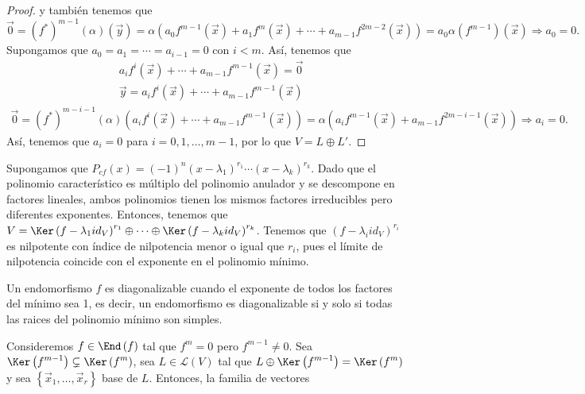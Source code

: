 \begin{proof}
y también tenemos que
\[ \vec{0} = \left(f^{*}\right)^{m -1}\left(\alpha \right)\left(\vec{y}\right) = \alpha \left(a_{0}f^{m -1}\left(\vec{x}\right) + a_{1}f^{m}\left(\vec{x}\right) + \cdots + a_{m -1}f^{2m-2}\left(\vec{x}\right)\right) = a_{0}\alpha\left(f^{m -1}\right)\left(\vec{x}\right) \Rightarrow a_{0} = 0.\]
Supongamos que $\displaystyle a_{0}= a_{1} = \cdots = a_{i-1} = 0 $ con $\displaystyle i < m $. Así, tenemos que
\[
\begin{split}
 & a_{i}f^{i}\left(\vec{x}\right) + \cdots + a_{m -1}f^{m -1}\left(\vec{x}\right) = \vec{0} \\
& \vec{y} = a_{i}f^{i}\left(\vec{x}\right) + \cdots + a_{m -1}f^{m -1}\left(\vec{x}\right) 
\end{split}
\]
\[
\begin{split}
	\vec{0} = \left(f^{*}\right)^{m -i-1}\left(\alpha \right)\left(a_{i}f^{i}\left(\vec{x}\right) + \cdots + a_{m -1}f^{m -1}\left(\vec{x}\right)\right) = \alpha\left(a_{i}f^{m -1}\left(\vec{x}\right)+a_{m -1}f^{2m -i-1}\left(\vec{x}\right)\right) \Rightarrow a_{i} = 0.
\end{split}
\]
Así, tenemos que $\displaystyle a_{i} = 0 $ para $\displaystyle i = 0, 1, \ldots, m -1 $, por lo que $\displaystyle V = L \oplus L'$.
\end{proof}
\begin{observation}
\normalfont Supongamos que $\displaystyle P_{cf}\left(x\right) = \left(-1\right)^{n}\left(x -\lambda_{1}\right)^{r_{1}} \cdots \left(x - \lambda_{k}\right)^{r_{k}} $. Dado que el polinomio característico es múltiplo del polinomio anulador y se descompone en factores lineales, ambos polinomios tienen los mismos factores irreducibles pero diferentes exponentes. 
Entonces, tenemos que $\displaystyle V = \Ker\left(f -\lambda_{1}id _{V}\right)^{r_{1}} \oplus \cdots \oplus \Ker\left(f - \lambda_{k}id _{V}\right)^{r_{k}} $. Tenemos que $\displaystyle \left(f -\lambda_{i}id _{V}\right)^{r_{i}} $ es nilpotente con índice de nilpotencia menor o igual que $\displaystyle r_{i} $, pues el límite de nilpotencia coincide con el exponente en el polinomio mínimo.
\end{observation}
\begin{observation}
\normalfont Un endomorfismo $\displaystyle f $ es diagonalizable cuando el exponente de todos los factores del mínimo sea 1, es decir, un endomorfismo es diagonalizable si y solo si todas las raices del polinomio mínimo son simples.
\end{observation}
Consideremos $\displaystyle f \in \End\left(f\right) $ tal que $\displaystyle f^{m} = 0 $ pero $\displaystyle f^{ m -1}\neq 0 $. Sea $\displaystyle \Ker\left(f^{m -1}\right)\subsetneq \Ker\left(f^{m}\right) $, sea $\displaystyle L \in \mathcal{L}\left(V\right) $ tal que $\displaystyle L \oplus \Ker\left(f^{m -1}\right) = \Ker\left(f^{m}\right) $ y sea $\displaystyle \left\{ \vec{x}_{1}, \ldots, \vec{x}_{r}\right\}  $ base de $\displaystyle L $. Entonces, la familia de vectores
